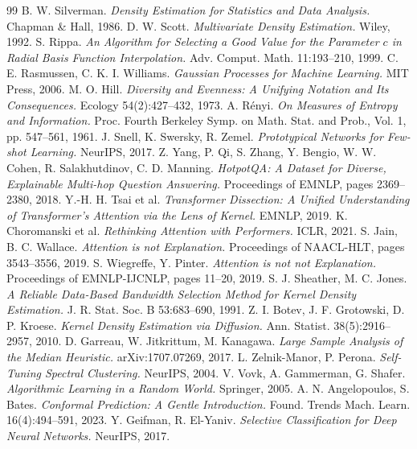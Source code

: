 \documentclass[10pt,twocolumn]{article}
\begin{document}
\begin{thebibliography}{99}
 B. W. Silverman. \emph{Density Estimation for Statistics and Data Analysis.} Chapman \& Hall, 1986.
 D. W. Scott. \emph{Multivariate Density Estimation.} Wiley, 1992.
 S. Rippa. \emph{An Algorithm for Selecting a Good Value for the Parameter $c$ in Radial Basis Function Interpolation.} Adv. Comput. Math. 11:193--210, 1999.
 C. E. Rasmussen, C. K. I. Williams. \emph{Gaussian Processes for Machine Learning.} MIT Press, 2006.
 M. O. Hill. \emph{Diversity and Evenness: A Unifying Notation and Its Consequences.} Ecology 54(2):427--432, 1973.
 A. R\'enyi. \emph{On Measures of Entropy and Information.} Proc. Fourth Berkeley Symp. on Math. Stat. and Prob., Vol. 1, pp. 547--561, 1961.
 J. Snell, K. Swersky, R. Zemel. \emph{Prototypical Networks for Few-shot Learning.} NeurIPS, 2017.
 Z. Yang, P. Qi, S. Zhang, Y. Bengio, W. W. Cohen, R. Salakhutdinov, C. D. Manning. \emph{HotpotQA: A Dataset for Diverse, Explainable Multi-hop Question Answering.} Proceedings of EMNLP, pages 2369--2380, 2018.
 Y.-H. H. Tsai et al. \emph{Transformer Dissection: A Unified Understanding of Transformer's Attention via the Lens of Kernel.} EMNLP, 2019.
 K. Choromanski et al. \emph{Rethinking Attention with Performers.} ICLR, 2021.
 S. Jain, B. C. Wallace. \emph{Attention is not Explanation.} Proceedings of NAACL-HLT, pages 3543--3556, 2019.
 S. Wiegreffe, Y. Pinter. \emph{Attention is not not Explanation.} Proceedings of EMNLP-IJCNLP, pages 11--20, 2019.
 S. J. Sheather, M. C. Jones. \emph{A Reliable Data-Based Bandwidth Selection Method for Kernel Density Estimation.} J. R. Stat. Soc. B 53:683--690, 1991.
 Z. I. Botev, J. F. Grotowski, D. P. Kroese. \emph{Kernel Density Estimation via Diffusion.} Ann. Statist. 38(5):2916--2957, 2010.
 D. Garreau, W. Jitkrittum, M. Kanagawa. \emph{Large Sample Analysis of the Median Heuristic.} arXiv:1707.07269, 2017.
 L. Zelnik-Manor, P. Perona. \emph{Self-Tuning Spectral Clustering.} NeurIPS, 2004.
 V. Vovk, A. Gammerman, G. Shafer. \emph{Algorithmic Learning in a Random World.} Springer, 2005.
 A. N. Angelopoulos, S. Bates. \emph{Conformal Prediction: A Gentle Introduction.} Found. Trends Mach. Learn. 16(4):494--591, 2023.
 Y. Geifman, R. El-Yaniv. \emph{Selective Classification for Deep Neural Networks.} NeurIPS, 2017.

\end{thebibliography}
\end{document}
